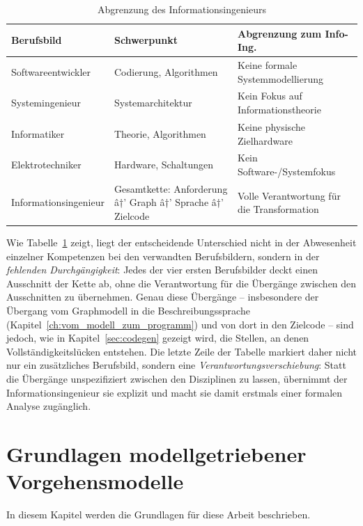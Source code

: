 ﻿\documentclass[a4paper,12pt]{report}
\theoremstyle{definition}
\begin{document}
\begin{table}[h]
\centering
\caption{Abgrenzung des Informationsingenieurs}
\label{tab:abgrenzung}
\begin{tabular}{@{}lp{4.5cm}p{4.5cm}@{}}
\toprule
\textbf{Berufsbild} & \textbf{Schwerpunkt} & \textbf{Abgrenzung zum Info-Ing.} \\
\midrule
Softwareentwickler & Codierung, Algorithmen & Keine formale Systemmodellierung \\
Systemingenieur    & Systemarchitektur      & Kein Fokus auf Informationstheorie \\
Informatiker       & Theorie, Algorithmen   & Keine physische Zielhardware \\
Elektrotechniker   & Hardware, Schaltungen  & Kein Software-/Systemfokus \\
Informationsingenieur & Gesamtkette: Anforderung â†’ Graph â†’ Sprache â†’ Zielcode & Volle Verantwortung für die Transformation \\
\bottomrule
\end{tabular}
\end{table}

\noindent
Wie Tabelle~\ref{tab:abgrenzung} zeigt, liegt der entscheidende Unterschied
nicht in der Abwesenheit einzelner Kompetenzen bei den verwandten
Berufsbildern, sondern in der \emph{fehlenden Durchgängigkeit}: Jedes der
vier ersten Berufsbilder deckt einen Ausschnitt der Kette ab, ohne die
Verantwortung für die Übergänge zwischen den Ausschnitten zu übernehmen.
Genau diese Übergänge -- insbesondere der Übergang vom Graphmodell in die
Beschreibungssprache (Kapitel~\ref{ch:vom_modell_zum_programm}) und von dort
in den Zielcode -- sind jedoch, wie in Kapitel~\ref{sec:codegen} gezeigt
wird, die Stellen, an denen Vollständigkeitslücken entstehen. Die letzte
Zeile der Tabelle markiert daher nicht nur ein zusätzliches Berufsbild,
sondern eine \emph{Verantwortungsverschiebung}: Statt die Übergänge
unspezifiziert zwischen den Disziplinen zu lassen, übernimmt der
Informationsingenieur sie explizit und macht sie damit erstmals einer
formalen Analyse zugänglich.


\chapter{Grundlagen modellgetriebener Vorgehensmodelle}

In diesem Kapitel werden die Grundlagen für diese Arbeit beschrieben.
\end{document}
